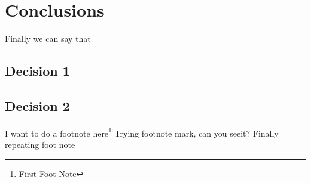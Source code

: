\chapter{Conclusions}
Finally we can say that

\section{Decision 1}
\section{Decision 2}

I want to do a footnote here\footnote{First Foot Note}
Trying footnote mark, can you see\footnotemark  it?
Finally repeating foot note\footnotemark[\value{footnote}]

